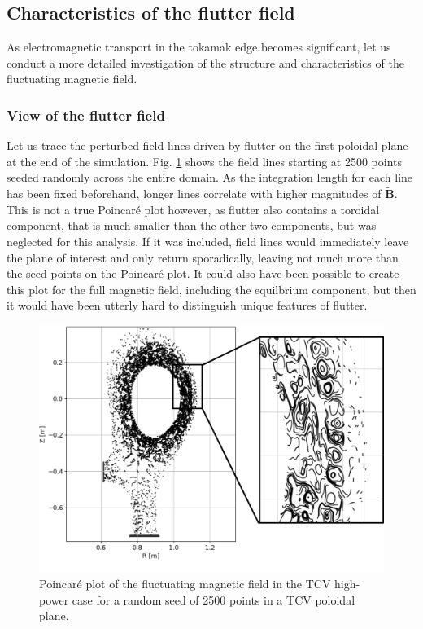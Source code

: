 \subsection{Characteristics of the flutter field}

As electromagnetic transport in the tokamak edge becomes significant, let us conduct a more detailed investigation of the structure and characteristics of the fluctuating magnetic field.

\subsubsection{View of the flutter field}


Let us trace the perturbed field lines driven by flutter on the first poloidal plane at the end of the simulation. Fig. \ref{fig:TCV_poincareFlutter} shows the field lines starting at 2500 points seeded randomly across the entire domain. As the integration length for each line has been fixed beforehand, longer lines correlate with higher magnitudes of $\mathbf{\tilde{B}}$. This is not a true Poincaré plot however, as flutter also contains a toroidal component, that is much smaller than the other two components, but was neglected for this analysis. If it was included, field lines would immediately leave the plane of interest and only return sporadically, leaving not much more than the seed points on the Poincaré plot. It could also have been possible to create this plot for the full magnetic field, including the equilbrium component, but then it would have been utterly hard to distinguish unique features of flutter. \newline 

\begin{figure}[H]\centering
	\centering
	\includegraphics[width=1\textwidth]{schemes/poincareFlutterHighPower.png}
	\caption[Poincaré plot of the fluctuating magnetic field in the TCV high-power case for a random seed of 2500 points in a TCV poloidal plane]{Poincaré plot of the fluctuating magnetic field in the TCV high-power case for a random seed of 2500 points in a TCV poloidal plane.}
	\label{fig:TCV_poincareFlutter}	
\end{figure}


